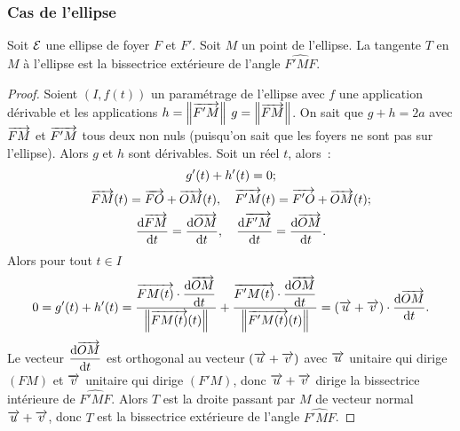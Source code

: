 \subsubsection{Cas de l'ellipse}
\begin{prop}
  Soit \(\mathcal{E}\) une ellipse de foyer \(F\) et \(F'\). Soit \(M\) un point de l'ellipse. La tangente \(T\) en \(M\) à l'ellipse est la bissectrice extérieure de l'angle \(\widehat{F'MF}\).
\end{prop}
\begin{proof}
  Soient \((I,f(t))\) un paramétrage de l'ellipse avec \(f\) une application dérivable et les applications \(h=\left\lVert\overrightarrow{F'M}\right\rVert\) \(g=\left\lVert\overrightarrow{FM}\right\rVert\). On sait que \(g+h=2a\) avec \(\overrightarrow{FM}\) et \(\overrightarrow{F'M}\) tous deux non nuls (puisqu'on sait que les foyers ne sont pas sur l'ellipse). Alors \(g\) et \(h\) sont dérivables. Soit un réel \(t\), alors~:
\begin{gather}
  g'(t)+h'(t)=0; \\
  \overrightarrow{FM}(t)=\overrightarrow{FO}+\overrightarrow{OM}(t), \quad \overrightarrow{F'M}(t)=\overrightarrow{F'O}+\overrightarrow{OM}(t);\\
  \dfrac{\mathrm{d} \overrightarrow{FM}}{\mathrm{d} t}=\dfrac{\mathrm{d} \overrightarrow{OM}}{\mathrm{d} t}, \quad \dfrac{\mathrm{d} \overrightarrow{F'M}}{\mathrm{d} t}=\dfrac{\mathrm{d} \overrightarrow{OM}}{\mathrm{d} t}.
\end{gather}
  Alors pour tout \(t \in I\)
  \begin{equation}
    0=g'(t)+h'(t)=\frac{\overrightarrow{FM(t)}\cdot\dfrac{\mathrm{d} \overrightarrow{OM}}{\mathrm{d} t}}{\left\lVert\overrightarrow{FM(t)}(t)\right\rVert} + \frac{\overrightarrow{F'M(t)}\cdot\dfrac{\mathrm{d} \overrightarrow{OM}}{\mathrm{d} t}}{\left\lVert\overrightarrow{F'M(t)}(t)\right\rVert}=(\overrightarrow{u}+\overrightarrow{v})\cdot \dfrac{\mathrm{d} \overrightarrow{OM}}{\mathrm{d} t}.
  \end{equation}
Le vecteur \(\dfrac{\mathrm{d} \overrightarrow{OM}}{\mathrm{d} t}\) est orthogonal au vecteur \((\overrightarrow{u}+\overrightarrow{v})\) avec \(\overrightarrow{u}\) unitaire qui dirige \((FM)\) et \(\overrightarrow{v}\) unitaire qui dirige \((F'M)\), donc \(\overrightarrow{u}+\overrightarrow{v}\) dirige la bissectrice intérieure de \(\widehat{F'MF}\). Alors \(T\) est la droite passant par \(M\) de vecteur normal \(\overrightarrow{u}+\overrightarrow{v}\), donc \(T\) est la bissectrice extérieure de l'angle \(\widehat{F'MF}\).
\end{proof}

